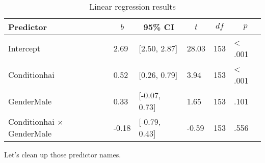 \documentclass[
  doc]{apa6}
\newenvironment{Shaded}{\begin{snugshade}}{\end{snugshade}}
\newcommand{\AttributeTok}[1]{\textcolor[rgb]{0.77,0.63,0.00}{#1}}
\newcommand{\FunctionTok}[1]{\textcolor[rgb]{0.00,0.00,0.00}{#1}}
\newcommand{\NormalTok}[1]{#1}
\newcommand{\OtherTok}[1]{\textcolor[rgb]{0.56,0.35,0.01}{#1}}
\newcommand{\SpecialCharTok}[1]{\textcolor[rgb]{0.00,0.00,0.00}{#1}}
\newcommand{\StringTok}[1]{\textcolor[rgb]{0.31,0.60,0.02}{#1}}
\begin{document}
\begin{Shaded}
\end{Shaded}

\begin{table}[h]

\begin{center}
\begin{threeparttable}

\caption{\label{tab:lm-table}Linear regression results}

\begin{tabular}{llllll}
\toprule
Predictor & \multicolumn{1}{c}{$b$} & \multicolumn{1}{c}{95\% CI} & \multicolumn{1}{c}{$t$} & \multicolumn{1}{c}{$\mathit{df}$} & \multicolumn{1}{c}{$p$}\\
\midrule
Intercept & 2.69 & {}[2.50, 2.87] & 28.03 & 153 & < .001\\
Conditionhai & 0.52 & {}[0.26, 0.79] & 3.94 & 153 & < .001\\
GenderMale & 0.33 & {}[-0.07, 0.73] & 1.65 & 153 & .101\\
Conditionhai $\times$ GenderMale & -0.18 & {}[-0.79, 0.43] & -0.59 & 153 & .556\\
\bottomrule
\end{tabular}

\end{threeparttable}
\end{center}

\end{table}

\newpage

Let's clean up those predictor names.

\begin{Shaded}
\end{Shaded}
\end{document}
